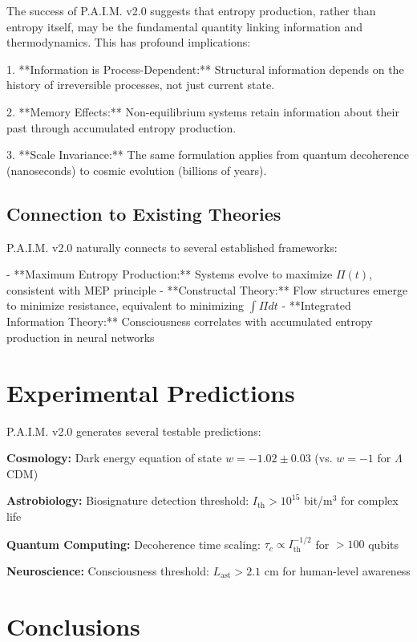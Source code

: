 \documentclass[twocolumn,10pt]{IEEEtran}
\begin{document}
The success of P.A.I.M. v2.0 suggests that entropy production, rather than entropy itself, may be the fundamental quantity linking information and thermodynamics. This has profound implications:

1. **Information is Process-Dependent:** Structural information depends on the history of irreversible processes, not just current state.

2. **Memory Effects:** Non-equilibrium systems retain information about their past through accumulated entropy production.

3. **Scale Invariance:** The same formulation applies from quantum decoherence (nanoseconds) to cosmic evolution (billions of years).

\subsection{Connection to Existing Theories}

P.A.I.M. v2.0 naturally connects to several established frameworks:

- **Maximum Entropy Production:** Systems evolve to maximize $\Pi(t)$, consistent with MEP principle
- **Constructal Theory:** Flow structures emerge to minimize resistance, equivalent to minimizing $\int \Pi dt$
- **Integrated Information Theory:** Consciousness correlates with accumulated entropy production in neural networks

\section{Experimental Predictions}

P.A.I.M. v2.0 generates several testable predictions:

\textbf{Cosmology:} Dark energy equation of state $w = -1.02 \pm 0.03$ (vs. $w = -1$ for $\Lambda$CDM)

\textbf{Astrobiology:} Biosignature detection threshold: $I_{\text{th}} > 10^{15}$ bit/m$^3$ for complex life

\textbf{Quantum Computing:} Decoherence time scaling: $\tau_c \propto I_{\text{th}}^{-1/2}$ for $> 100$ qubits

\textbf{Neuroscience:} Consciousness threshold: $L_{\text{ast}} > 2.1$ cm for human-level awareness

\section{Conclusions}
\end{document}
